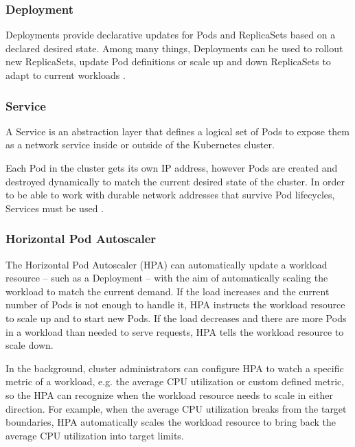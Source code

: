 \subsubsection{Deployment}

Deployments provide declarative updates for Pods and ReplicaSets based on a declared desired state. Among many things, Deployments can be used to rollout new ReplicaSets, update Pod definitions or scale up and down ReplicaSets to adapt to current workloads \cite{KubernetesDeployment}.

\subsubsection{Service} \label{k8s-service}

A Service is an abstraction layer that defines a logical set of Pods to expose them as a network service inside or outside of the Kubernetes cluster.

Each Pod in the cluster gets its own IP address, however Pods are created and destroyed dynamically to match the current desired state of the cluster. In order to be able to work with durable network addresses that survive Pod lifecycles, Services must be used \cite{KubernetesService}.


\subsubsection{Horizontal Pod Autoscaler}

The Horizontal Pod Autoscaler (HPA) can automatically update a workload resource -- such as a Deployment -- with the aim of automatically scaling the workload to match the current demand. If the load increases and the current number of Pods is not enough to handle it, HPA instructs the workload resource to scale up and to start new Pods. If the load decreases and there are more Pods in a workload than needed to serve requests, HPA tells the workload resource to scale down.

In the background, cluster administrators can configure HPA to watch a specific metric of a workload, e.g. the average CPU utilization or custom defined metric, so the HPA can recognize when the workload resource needs to scale in either direction. For example, when the average CPU utilization breaks from the target boundaries, HPA automatically scales the workload resource to bring back the average CPU utilization into target limits.

